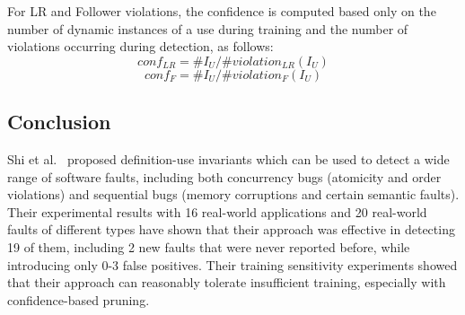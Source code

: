 For LR and Follower violations, the confidence is computed based only on the number of dynamic instances of a
use during training and the number of violations occurring during detection, as follows:
$$conf_{LR}=\#I_U / \#violation_{LR}(I_U)$$
$$conf_{F}=\#I_U / \#violation_{F}(I_U)$$

\subsection{Conclusion}
Shi et al.~\cite{wrongDefinition} proposed definition-use invariants which can be used to detect a wide range of software faults, including both concurrency bugs (atomicity and order violations) and sequential bugs (memory corruptions and certain semantic faults). Their experimental results with 16 real-world applications and 20 real-world faults of different types have shown that their approach was effective in detecting 19 of them, including 2 new faults that were never reported before, while introducing only 0-3 false positives. Their training sensitivity experiments showed that their approach can reasonably tolerate insufficient training, especially with confidence-based pruning.

